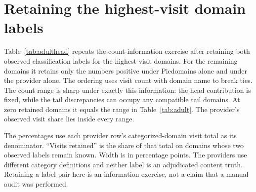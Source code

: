 \section{Retaining the highest-visit domain labels}\label{app:adulthead}
Table~\ref{tab:adulthead} repeats the count-information exercise after
retaining both observed classification labels for the highest-visit domains.
For the remaining domains it retains only the numbers positive under
Piedomains alone and under the provider alone. The ordering uses visit count
with domain name to break ties. The count range is sharp under exactly this
information: the head contribution is fixed, while the tail discrepancies
can occupy any compatible tail domains. At zero retained domains it equals
the range in Table~\ref{tab:adult}. The provider's observed visit share lies
inside every range.

\begin{table}[htbp]
\centering\small
\setlength{\tabcolsep}{3.5pt}
\caption{Count-compatible provider visit shares after retaining label pairs
for the highest-visit domains}
\label{tab:adulthead}

\par\smallskip
\begin{minipage}{\linewidth}\footnotesize
The percentages use each provider row's categorized-domain visit total as
its denominator. ``Visits retained'' is the share of that total on domains
whose two observed labels remain known. Width is in percentage points. The
providers use different category definitions and neither label is an
adjudicated content truth. Retaining a label pair here is an information
exercise, not a claim that a manual audit was performed.
\end{minipage}
\end{table}
